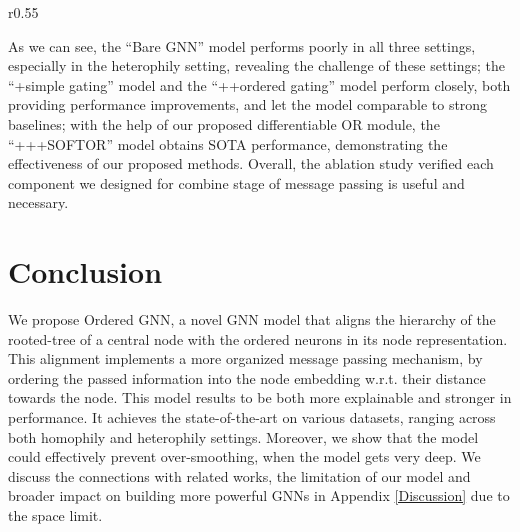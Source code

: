\documentclass{article}
\begin{document}
\begin{wraptable}{r}{0.55\textwidth}
\vspace{-0.55cm}
\caption{Ablation study}
\label{table.results.ablation}
\centering
\vspace{0.1cm}
\vspace{-0.25cm}
\end{wraptable}


As we can see, the ``Bare GNN'' model performs poorly in all three settings, especially in the heterophily setting, revealing the challenge of these settings; the ``+simple gating'' model and the ``++ordered gating'' model perform closely, both providing performance improvements, and let the model comparable to strong baselines; with the help of our proposed differentiable OR module, the ``+++SOFTOR'' model obtains SOTA performance, demonstrating the effectiveness of our proposed methods. Overall, the ablation study verified each component we designed for combine stage of message passing is useful and necessary.


\section{Conclusion}
We propose Ordered GNN, a novel GNN model that aligns the hierarchy of the rooted-tree of a central node with the ordered neurons in its node representation. This alignment implements a more organized message passing mechanism, by ordering the passed information into the node embedding w.r.t. their distance towards the node. This model results to be both more explainable and stronger in performance. It achieves the state-of-the-art on various datasets, ranging across both homophily and heterophily settings. Moreover, we show that the model could effectively prevent over-smoothing, when the model gets very deep. We discuss the connections with related works, the limitation of our model and broader impact on building more powerful GNNs in Appendix \ref{Discussion} due to the space limit.
\end{document}
